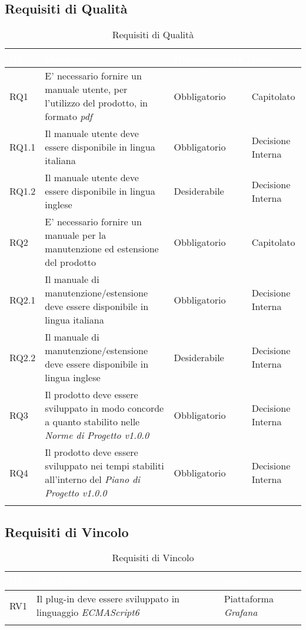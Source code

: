 \subsection{Requisiti di Qualità}\label{RQ}
\begin{center}
\begin{longtable}[c]{|m{}|m{}|m{}|m{}|}
\hline
\rowcolor{bluelogo}\textbf{\textcolor{white}{ID}} & \textbf{\textcolor{white}{Descrizione}} & \textbf{\textcolor{white}{Obbligatorietà}} & \textbf{\textcolor{white}{Fonti}}\\
\hline \hline
\endhead
RQ1 & E' necessario fornire un manuale utente, per l'utilizzo del prodotto, in formato \textit{pdf} & Obbligatorio & Capitolato\\
\hline
\rowcolor{grigio}RQ1.1 & Il manuale utente deve essere disponibile in lingua italiana & Obbligatorio & Decisione Interna\\
\hline
RQ1.2 & Il manuale utente deve essere disponibile in lingua inglese & Desiderabile & Decisione Interna\\
\hline
\rowcolor{grigio}RQ2 & E' necessario fornire un manuale per la manutenzione ed estensione del prodotto & Obbligatorio & Capitolato\\
\hline
RQ2.1 & Il manuale di manutenzione/estensione deve essere disponibile in lingua italiana & Obbligatorio & Decisione Interna\\
\hline
\rowcolor{grigio}RQ2.2 & Il manuale di manutenzione/estensione deve essere disponibile in lingua inglese & Desiderabile & Decisione Interna\\
\hline
RQ3 & Il prodotto deve essere sviluppato in modo concorde a quanto stabilito nelle \textit{Norme di Progetto v1.0.0} & Obbligatorio & Decisione Interna\\
\hline
\rowcolor{grigio}RQ4 & Il prodotto deve essere sviluppato nei tempi stabiliti all'interno del \textit{Piano di Progetto v1.0.0} & Obbligatorio & Decisione Interna\\
\hline
\caption{Requisiti di Qualità}
\end{longtable}
\end{center}



\subsection{Requisiti di Vincolo}\label{RV}
\begin{center}
\begin{longtable}[c]{|m{}|m{}|m{}|}
\hline
\rowcolor{bluelogo}\textbf{\textcolor{white}{ID}} & \textbf{\textcolor{white}{Descrizione}} & \textbf{\textcolor{white}{Fonti}}\\
\hline \hline
\endfirsthead
RV1 & Il plug-in deve essere sviluppato in linguaggio \textit{ECMAScript6} & Piattaforma \textit{Grafana}\\
\hline
\caption{Requisiti di Vincolo}
\end{longtable}
\end{center}
\pagebreak

